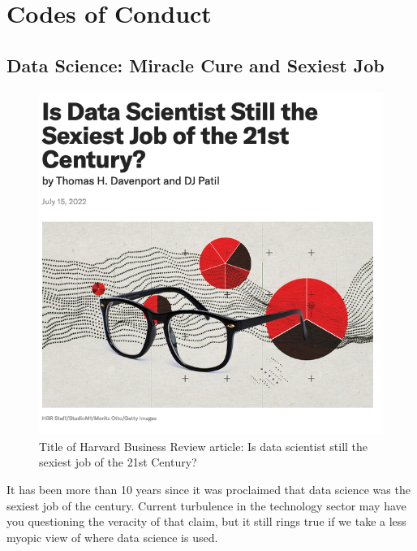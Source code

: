 \documentclass[
  letterpaper,
  DIV=11,
  numbers=noendperiod]{scrreprt}
\begin{document}
\chapter{Codes of Conduct}\label{ethics-conduct}

\section{Data Science: Miracle Cure and Sexiest
Job}\label{data-science-miracle-cure-and-sexiest-job}

\begin{figure}[H]

{\centering \includegraphics{images/503-ethics-conduct/harvard-business-review-sexiest-job.png}

}

\caption{Title of Harvard Business Review article: Is data scientist
still the sexiest job of the 21st Century?}

\end{figure}%

It has been more than 10 years since it was proclaimed that data science
was the sexiest job of the century. Current turbulence in the technology
sector may have you questioning the veracity of that claim, but it still
rings true if we take a less myopic view of where data science is used.
\end{document}
